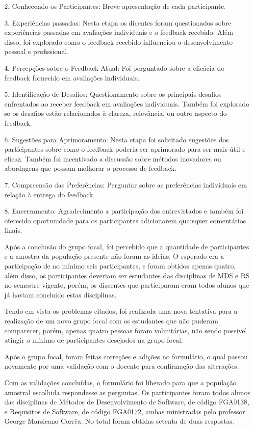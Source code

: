 2. Conhecendo os Participantes: Breve apresentação de cada participante.

3. Experiências passadas: Nesta etapa os dicentes foram questionados sobre experiências passadas em avaliações individuais e o feedback recebido. Além disso, foi explorado como o feedback recebido influenciou o desenvolvimento pessoal e profissional. 

4. Percepções sobre o Feedback Atual: Foi perguntado sobre a eficácia do feedback fornecido em avaliações individuais. 

5. Identificação de Desafios: Questionamento sobre os principais desafios enfrentados ao receber feedback em avaliações individuais. Também foi explorado se os desafios estão relacionados à clareza, relevância, ou outro aspecto do feedback. 

6. Sugestões para Aprimoramento: Nesta etapa foi solicitado sugestões dos participantes sobre como o feedback poderia ser aprimorado para ser mais útil e eficaz. Também foi incentivado a discussão sobre métodos inovadores ou abordagens que possam melhorar o processo de feedback. 

7. Compreensão das Preferências: Perguntar sobre as preferências individuais em relação à entrega do feedback.

8. Encerramento: Agradecimento a participação dos entrevistados e também foi oferecido oportunidade para os participantes adicionarem quaisquer comentários finais. 

Após a conclusão do grupo focal, foi percebido que a quantidade de participantes e a amostra da população presente não foram as ideias, O esperado era a participação de no mínimo seis participantes, e foram obtidos apenas quatro, além disso, os participantes deveriam ser estudantes das disciplinas de MDS e RS no semestre vigente, porém, os discentes que participaram eram todos alunos que já haviam concluido estas disciplinas.

Tendo em vista os problemas citados, foi realizada uma nova tentativa para a realização de um novo grupo focal com os estudantes que não puderam comparecer, porém, apenas quatro pessoas foram voluntárias, não sendo possível atingir o mínimo de participantes desejados na grupo focal.

Após o grupo focal, foram feitas correções e adições no formulário, o qual passou novamente por uma validação com o docente para confirmação das alterações.

Com as validações concluídas, o formulário foi liberado para que a população amostral escolhida respondesse as perguntas. Os participantes foram todos alunos das disciplinas de Métodos de Desenvolvimento de Software, de código FGA0138, e Requisitos de Software, de código FGA0172, ambas ministradas pelo professor George Marsicano Corrêa. No total foram obtidas setenta de duas respostas.

